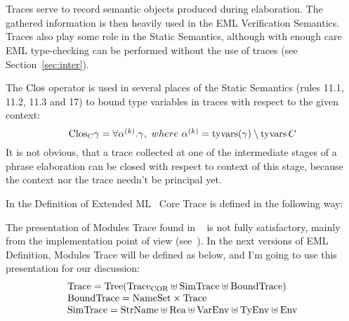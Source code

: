 
\section{\sectrace}
\label{sec:trace}

\subsection{\sectraces}
\label{sec:traces}

{
Traces serve to record semantic objects produced during elaboration.
The gathered information is then heavily used in the EML Verification Semantics.
Traces also play some role in the Static Semantics, although with enough care
EML type-checking can be performed without the use of traces (see Section~\ref{sec:inter}).

The ${\rm Clos}$ operator is used in several places of the Static Semantics
(rules 11.1, 11.2, 11.3 and 17)
to bound type variables in traces with respect to the given context: 
$$\cl{C}{\trace}=\forall\alphak.\trace,\ where\ \alphak=\TyVarFcn(\trace)\setminus\TyVarFcn C$$
It is not obvious, that a trace collected at one of the intermediate
stages of a phrase elaboration can be closed with respect
to context of this stage, because the context nor the trace needn't be principal yet. 

In the Definition of Extended ML~\cite{bib:KST94} Core Trace is defined in the following way:

The presentation of Modules Trace found in ~\cite{bib:KST94} is not fully satisfactory, 
mainly from the implementation point of view (see~\cite{JKS96}). In the next versions of 
EML Definition, Modules Trace will be defined as below, and I'm going to
use this presentation for our discussion:
\begin{displaymath}
\begin{array}{l}
\mbox{Trace} = \mbox{Tree}(\mbox{Trace}_{\rm COR}\uplus\mbox{SimTrace}\uplus\mbox{BoundTrace})\\
\mbox{BoundTrace}={\rm NameSet}\times\mbox{Trace}\\
\mbox{SimTrace} = {\rm StrName}\uplus\mbox{Rea}\uplus{\rm VarEnv}\uplus{\rm TyEnv}\uplus{\rm Env}\\
\end{array}
\end{displaymath}
}
{}

